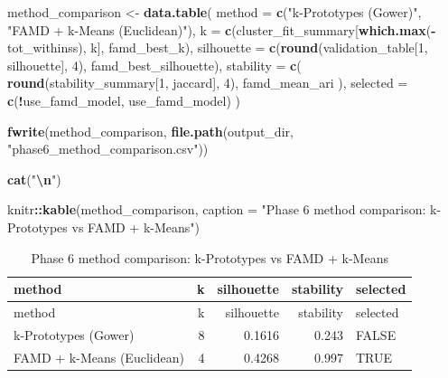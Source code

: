 \documentclass[
]{article}
\newenvironment{Shaded}{\begin{snugshade}}{\end{snugshade}}
\newcommand{\AttributeTok}[1]{\textcolor[rgb]{0.13,0.29,0.53}{#1}}
\newcommand{\DecValTok}[1]{\textcolor[rgb]{0.00,0.00,0.81}{#1}}
\newcommand{\FunctionTok}[1]{\textcolor[rgb]{0.13,0.29,0.53}{\textbf{#1}}}
\newcommand{\NormalTok}[1]{#1}
\newcommand{\OtherTok}[1]{\textcolor[rgb]{0.56,0.35,0.01}{#1}}
\newcommand{\SpecialCharTok}[1]{\textcolor[rgb]{0.81,0.36,0.00}{\textbf{#1}}}
\newcommand{\StringTok}[1]{\textcolor[rgb]{0.31,0.60,0.02}{#1}}
\begin{document}
\begin{Shaded}
\begin{Highlighting}[]
\NormalTok{method\_comparison }\OtherTok{\textless{}{-}} \FunctionTok{data.table}\NormalTok{(}
  \AttributeTok{method =} \FunctionTok{c}\NormalTok{(}\StringTok{"k{-}Prototypes (Gower)"}\NormalTok{, }\StringTok{"FAMD + k{-}Means (Euclidean)"}\NormalTok{),}
  \AttributeTok{k =} \FunctionTok{c}\NormalTok{(cluster\_fit\_summary[}\FunctionTok{which.max}\NormalTok{(}\SpecialCharTok{{-}}\NormalTok{tot\_withinss), k], famd\_best\_k),}
  \AttributeTok{silhouette =} \FunctionTok{c}\NormalTok{(}\FunctionTok{round}\NormalTok{(validation\_table[}\DecValTok{1}\NormalTok{, silhouette], }\DecValTok{4}\NormalTok{), famd\_best\_silhouette),}
  \AttributeTok{stability =} \FunctionTok{c}\NormalTok{(}
    \FunctionTok{round}\NormalTok{(stability\_summary[}\DecValTok{1}\NormalTok{, jaccard], }\DecValTok{4}\NormalTok{),}
\NormalTok{    famd\_mean\_ari}
\NormalTok{  ),}
  \AttributeTok{selected =} \FunctionTok{c}\NormalTok{(}\SpecialCharTok{!}\NormalTok{use\_famd\_model, use\_famd\_model)}
\NormalTok{)}

\FunctionTok{fwrite}\NormalTok{(method\_comparison, }\FunctionTok{file.path}\NormalTok{(output\_dir, }\StringTok{"phase6\_method\_comparison.csv"}\NormalTok{))}

\FunctionTok{cat}\NormalTok{(}\StringTok{"}\SpecialCharTok{\textbackslash{}n}\StringTok{"}\NormalTok{)}
\end{Highlighting}
\end{Shaded}

\begin{Shaded}
\begin{Highlighting}[]
\NormalTok{knitr}\SpecialCharTok{::}\FunctionTok{kable}\NormalTok{(method\_comparison, }\AttributeTok{caption =} \StringTok{"Phase 6 method comparison: k{-}Prototypes vs FAMD + k{-}Means"}\NormalTok{)}
\end{Highlighting}
\end{Shaded}

\begin{longtable}[]{@{}lrrrl@{}}
\caption{Phase 6 method comparison: k-Prototypes vs FAMD +
k-Means}\tabularnewline
\toprule\noalign{}
method & k & silhouette & stability & selected \\
\midrule\noalign{}
\endfirsthead
\toprule\noalign{}
method & k & silhouette & stability & selected \\
\midrule\noalign{}
\endhead
\bottomrule\noalign{}
\endlastfoot
k-Prototypes (Gower) & 8 & 0.1616 & 0.243 & FALSE \\
FAMD + k-Means (Euclidean) & 4 & 0.4268 & 0.997 & TRUE \\
\end{longtable}
\end{document}
